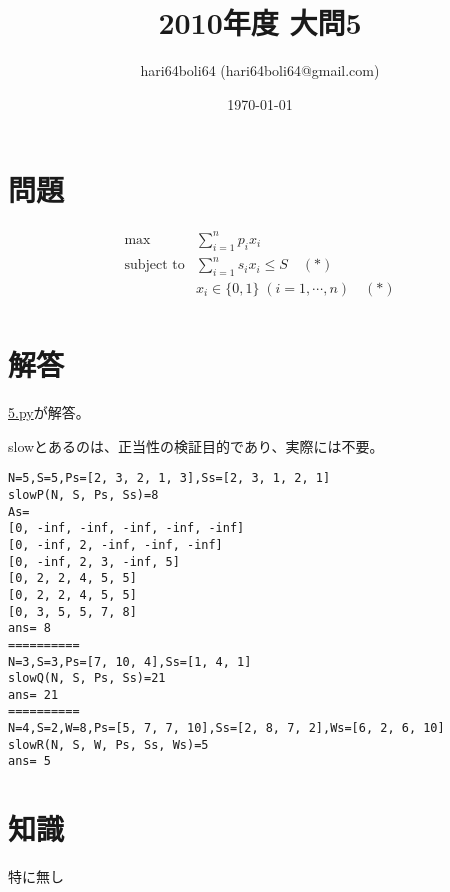 \documentclass[a4paper, 10pt, dvipdfmx]{jlreq}
\begin{document}
\title{2010年度 大問5}
\author{hari64boli64 (hari64boli64@gmail.com)}
\date{\today}
\maketitle

\section{問題}

\begin{align*}
  \max              & \sum_{i=1}^{n} p_i x_i                      \\
  \text{subject to} & \sum_{i=1}^{n} s_i x_i \leq S \quad (*)     \\
                    & x_i \in \{0,1\} \; (i=1,\cdots,n) \quad (*) \\
\end{align*}

\section{解答}

\href{./5.py}{5.py}が解答。

slowとあるのは、正当性の検証目的であり、実際には不要。



\begin{lstlisting}[caption=output, label=code:output]
N=5,S=5,Ps=[2, 3, 2, 1, 3],Ss=[2, 3, 1, 2, 1]
slowP(N, S, Ps, Ss)=8
As=
[0, -inf, -inf, -inf, -inf, -inf]
[0, -inf, 2, -inf, -inf, -inf]
[0, -inf, 2, 3, -inf, 5]
[0, 2, 2, 4, 5, 5]
[0, 2, 2, 4, 5, 5]
[0, 3, 5, 5, 7, 8]
ans= 8
==========
N=3,S=3,Ps=[7, 10, 4],Ss=[1, 4, 1]
slowQ(N, S, Ps, Ss)=21
ans= 21
==========
N=4,S=2,W=8,Ps=[5, 7, 7, 10],Ss=[2, 8, 7, 2],Ws=[6, 2, 6, 10]
slowR(N, S, W, Ps, Ss, Ws)=5
ans= 5
\end{lstlisting}

\section{知識}

特に無し
\end{document}

